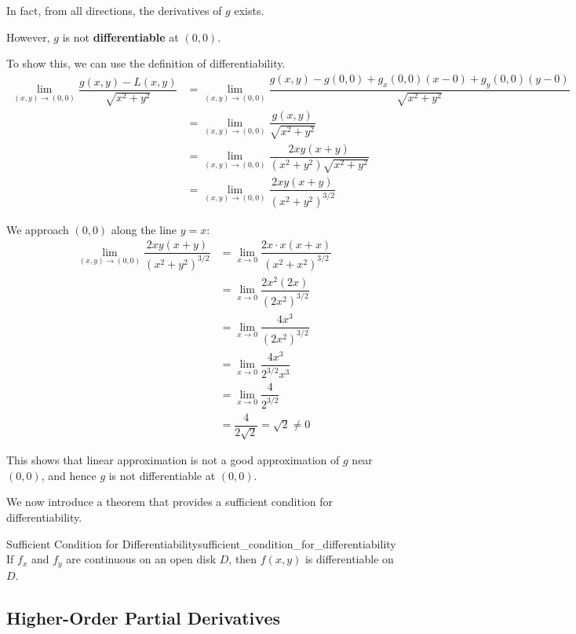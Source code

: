 \begin{example}
In fact, from all directions, the derivatives of $g$ exists.

However, $g$ is not \textbf{differentiable} at $(0, 0)$.

To show this, we can use the definition of differentiability.
\begin{align*}
    \lim_{(x, y) \to (0, 0)} \dfrac{g(x, y) - L(x, y)}{\sqrt{x^2 + y^2}} &= \lim_{(x, y) \to (0, 0)} \dfrac{g(x, y) - g(0, 0) + g_x(0, 0)(x - 0) + g_y(0, 0)(y - 0)}{\sqrt{x^2 + y^2}} \\[0.5em]
    &= \lim_{(x, y) \to (0, 0)} \dfrac{g(x, y)}{\sqrt{x^2 + y^2}} \\[0.5em]
    &= \lim_{(x, y) \to (0, 0)} \dfrac{2xy(x+y)}{(x^2+y^2)\sqrt{x^2 + y^2}} \\[0.5em]
    &= \lim_{(x, y) \to (0, 0)} \dfrac{2xy(x+y)}{(x^2+y^2)^{3/2}}
\end{align*}

We approach $(0, 0)$ along the line $y = x$:
\begin{align*}
    \lim_{(x, y) \to (0, 0)} \dfrac{2xy(x+y)}{(x^2+y^2)^{3/2}} &= \lim_{x \to 0} \dfrac{2x \cdot x(x+x)}{(x^2+x^2)^{3/2}} \\[0.5em]
    &= \lim_{x \to 0} \dfrac{2x^2(2x)}{(2x^2)^{3/2}} \\[0.5em]
    &= \lim_{x \to 0} \dfrac{4x^3}{(2x^2)^{3/2}} \\[0.5em]
    &= \lim_{x \to 0} \dfrac{4x^3}{2^{3/2} x^3} \\[0.5em]
    &= \lim_{x \to 0} \dfrac{4}{2^{3/2}} \\[0.5em]
    &= \dfrac{4}{2\sqrt{2}} = \sqrt{2} \neq 0
\end{align*}

This shows that linear approximation is not a good approximation of $g$ near $(0, 0)$, and hence $g$ is not differentiable at $(0, 0)$.

We now introduce a theorem that provides a sufficient condition for differentiability.
\begin{theorem}{Sufficient Condition for Differentiability}{sufficient_condition_for_differentiability}
    If $f_x$ and $f_y$ are continuous on an open disk $D$, then $f(x, y)$ is differentiable on $D$.
\end{theorem}

\end{example}

\subsection{Higher-Order Partial Derivatives}

